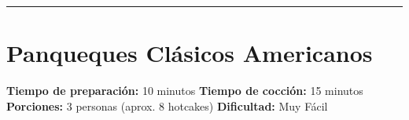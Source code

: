 \documentclass[11pt,a4paper]{article}
\begin{document}
\vspace{1.5cm}
\rule{\linewidth}{0.5pt}
\vspace{1.5cm}

\section{Panqueques Clásicos Americanos}

\begin{tcolorbox}[colback=backgroundbox, colframe=secondarycolor, title=Información General, fonttitle=\bfseries]
    \textbf{Tiempo de preparación:} 10 minutos \hfill \textbf{Tiempo de cocción:} 15 minutos \\
    \textbf{Porciones:} 3 personas (aprox. 8 hotcakes) \hfill \textbf{Dificultad:} Muy Fácil
\end{tcolorbox}

\vspace{0.5cm}
\end{document}
